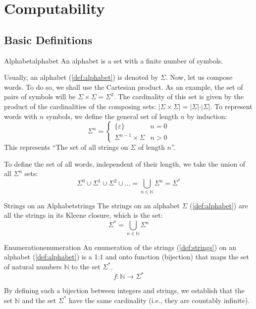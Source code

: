 \chapter{Computability}
\section{Basic Definitions}

\begin{definition}{Alphabet}{alphabet}
    An alphabet is a set with a finite number of symbols.
\end{definition}

\noindent Usually, an alphabet (\cref{def:alphabet}) is denoted by \(\Sigma\). Now, let us compose words. To do so, we shall use the Cartesian product. As an example, the set of pairs of symbols will be \(\Sigma\times\Sigma=\Sigma^2\). The cardinality of this set is given by the product of the cardinalities of the composing sets: \(\vert{}\Sigma\times\Sigma\vert{}=\vert{}\Sigma\vert{}\cdot\vert{}\Sigma\vert{}\). To represent words with \(n\) symbols, we define the general set of length \(n\) by induction:
\[\Sigma^n=\begin{cases}         \{\varepsilon\} & n=0\\         \Sigma^{n-1}\times \Sigma & n>0     \end{cases}\]
This represents ``The set of all strings on \(\Sigma\) of length \(n\)''.

\noindent To define the set of all words, independent of their length, we take the union of all \(\Sigma^n\) sets:
\[
    \Sigma^0 \cup\Sigma^1 \cup\Sigma^2 \cup\ldots=\bigcup_{n\in\mathbb{N}}\Sigma^n=\Sigma^*
\]

\begin{definition}{Strings on an Alphabet}{strings}
    The strings on an alphabet \(\Sigma\) (\cref{def:alphabet}) are all the strings in its Kleene closure, which is the set:
    \[\Sigma^*=\bigcup_{n\in\mathbb{N}}\Sigma^n\]
\end{definition}

\begin{definition}{Enumeration}{enumeration}
    An enumeration of the strings (\cref{def:strings}) on an alphabet (\cref{def:alphabet}) is a 1:1 and onto function (bijection) that maps the set of natural numbers \(\mathbb{N}\) to the set \(\Sigma^*\).
    \[
        f:\mathbb{N}\rightarrow \Sigma^*
    \]
\end{definition}

\noindent By defining such a bijection between integers and strings, we establish that the set \(\mathbb{N}\) and the set \(\Sigma^*\) have the same cardinality (i.e., they are countably infinite).

